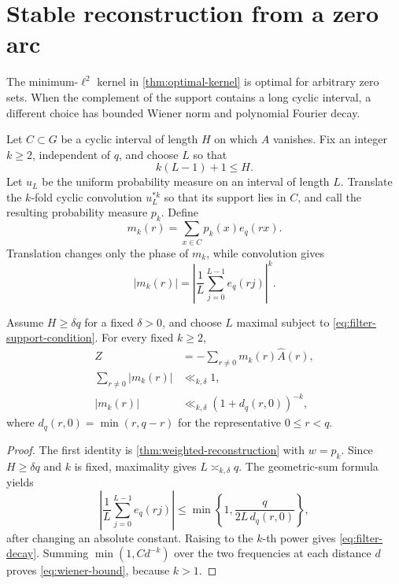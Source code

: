 \section{Stable reconstruction from a zero arc}
\label{sec:zero-arc-filter}

The minimum-\(\ell^2\) kernel in \cref{thm:optimal-kernel} is optimal
for arbitrary zero sets.  When the complement of the support contains
a long cyclic interval, a different choice has bounded Wiener norm
and polynomial Fourier decay.

Let \(C\subset G\) be a cyclic interval of length \(H\) on which
\(A\) vanishes.  Fix an integer \(k\ge2\), independent of \(q\), and
choose \(L\) so that
\begin{equation}
 k(L-1)+1\le H.
\label{eq:filter-support-condition}
\end{equation}
Let \(u_L\) be the uniform probability measure on an interval of
length \(L\).  Translate the \(k\)-fold cyclic convolution
\(u_L^{*k}\) so that its support lies in \(C\), and call the resulting
probability measure \(p_k\).  Define
\[
 m_k(r)=\sum_{x\in C}p_k(x)e_q(rx).
\]
Translation changes only the phase of \(m_k\), while convolution gives
\begin{equation}
 |m_k(r)|
 =
 \left|
 \frac1L\sum_{j=0}^{L-1}e_q(rj)
 \right|^k.
\label{eq:filter-multiplier}
\end{equation}

\begin{theorem}
\label{thm:stable-zero-arc}
Assume \(H\ge\delta q\) for a fixed \(\delta>0\), and choose \(L\)
maximal subject to \eqref{eq:filter-support-condition}.  For every
fixed \(k\ge2\),
\begin{align}
 Z&=-\sum_{r\ne0}m_k(r)\widehat A(r),
 \label{eq:filtered-reassembly}\\
 \sum_{r\ne0}|m_k(r)|&\ll_{k,\delta}1,
 \label{eq:wiener-bound}\\
 |m_k(r)|&\ll_{k,\delta}
 (1+d_q(r,0))^{-k},
 \label{eq:filter-decay}
\end{align}
where \(d_q(r,0)=\min(r,q-r)\) for the representative
\(0\le r<q\).
\end{theorem}

\begin{proof}
The first identity is \cref{thm:weighted-reconstruction} with
\(w=p_k\).  Since \(H\ge\delta q\) and \(k\) is fixed, maximality
gives \(L\asymp_{k,\delta}q\).  The geometric-sum formula yields
\[
 \left|
 \frac1L\sum_{j=0}^{L-1}e_q(rj)
 \right|
 \le
 \min\left\{1,\frac{q}{2L\,d_q(r,0)}\right\},
\]
after changing an absolute constant.  Raising to the \(k\)-th power
gives \eqref{eq:filter-decay}.  Summing
\(\min(1,Cd^{-k})\) over the two frequencies at each distance
\(d\) proves \eqref{eq:wiener-bound}, because \(k>1\).
\end{proof}

